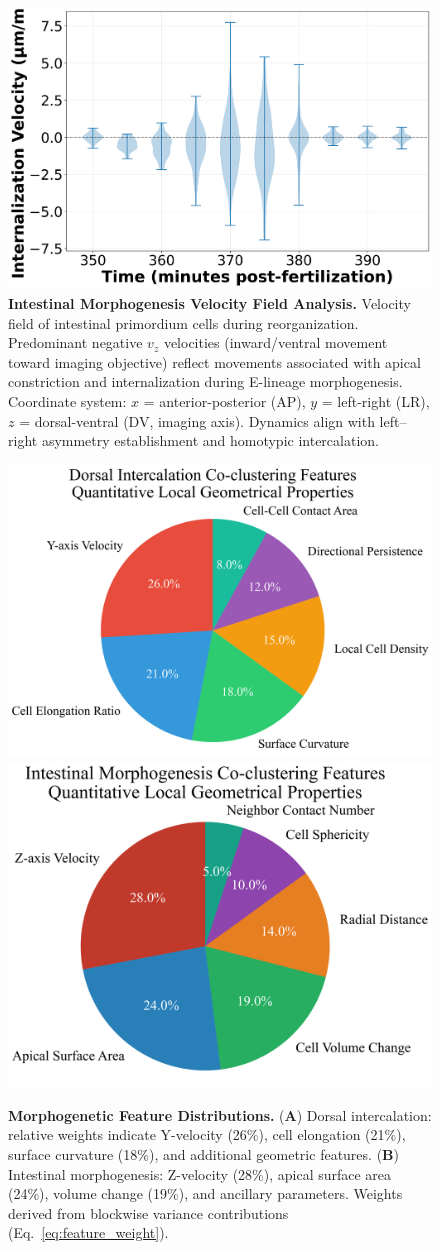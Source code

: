 \documentclass[unnumsec,webpdf,modern,large,namedate]{oup-authoring-template}%
\theoremstyle{thmstyleone}\newtheorem{theorem}{Theorem}
\theoremstyle{thmstyletwo}\newtheorem{example}{Example}
\theoremstyle{thmstylethree}\newtheorem{definition}{Definition}
\begin{document}
\begin{figure}[t]
  \centering
  \includegraphics[width=\linewidth]{Demo6_Intestinal_Velocity_Field.png}
  \caption{\textbf{Intestinal Morphogenesis Velocity Field Analysis.} Velocity field of intestinal primordium cells during reorganization. Predominant negative $v_z$ velocities (inward/ventral movement toward imaging objective) reflect movements associated with apical constriction and internalization during E-lineage morphogenesis. Coordinate system: $x$ = anterior-posterior (AP), $y$ = left-right (LR), $z$ = dorsal-ventral (DV, imaging axis). Dynamics align with left--right asymmetry establishment and homotypic intercalation.}
  \label{fig:int_velocity}
\end{figure}

\begin{figure}[t]
  \centering
  \includegraphics[width=.48\linewidth]{Demo7A_Dorsal_Coclustering_Features_Pie.png}\hfill
  \includegraphics[width=.48\linewidth]{Demo7B_Intestinal_Coclustering_Features_Pie.png}
  \caption{\textbf{Morphogenetic Feature Distributions.} (\textbf{A}) Dorsal intercalation: relative weights indicate Y-velocity (26\%), cell elongation (21\%), surface curvature (18\%), and additional geometric features. (\textbf{B}) Intestinal morphogenesis: Z-velocity (28\%), apical surface area (24\%), volume change (19\%), and ancillary parameters. Weights derived from blockwise variance contributions (Eq.~\ref{eq:feature_weight}).}
  \label{fig:features}
\end{figure}
\end{document}
